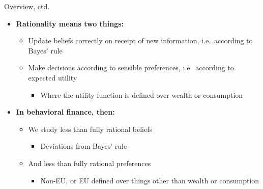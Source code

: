 \documentclass[aspectratio=169, 11pt]{beamer}
\begin{document}
\begin{frame}{Overview, ctd.}
\begin{itemize}
\item \textbf{Rationality means two things:}
  \begin{itemize}
  \item Update beliefs correctly on receipt of new information, i.e.\ according to Bayes' rule
  \item Make decisions according to sensible preferences, i.e.\ according to expected utility
    \begin{itemize}
    \item Where the utility function is defined over wealth or consumption
    \end{itemize}
  \end{itemize}
\item \textbf{In behavioral finance, then:}
  \begin{itemize}
  \item We study less than fully rational beliefs
    \begin{itemize}
    \item Deviations from Bayes' rule
    \end{itemize}
  \item And less than fully rational preferences
    \begin{itemize}
    \item Non-EU, or EU defined over things other than wealth or consumption
    \end{itemize}
  \end{itemize}
\end{itemize}
\end{frame}
\end{document}
